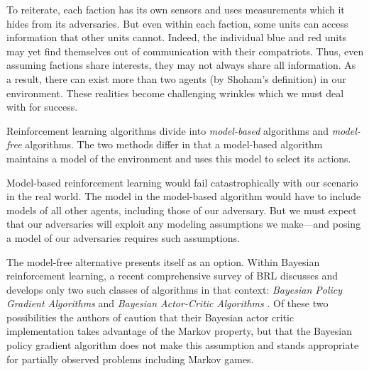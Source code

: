\documentclass{article}
\begin{document}
To reiterate, each faction has its own sensors and uses measurements
which it hides from its adversaries.  But even within each faction,
some units can access information that other units cannot.  Indeed,
the individual blue and red units may yet find themselves out of
communication with their compatriots.  Thus, even assuming factions
share interests, they may not always share all information.  As a
result, there can exist more than two agents (by Shoham's definition)
in our environment.  These realities become challenging wrinkles which
we must deal with for success.

Reinforcement learning algorithms divide into \emph{model-based}
algorithms and \emph{model-free} algorithms.  The two methods differ
in that a model-based algorithm maintains a model of the environment
and uses this model to select its actions.

Model-based reinforcement learning would fail catastrophically with
our scenario in the real world.  The model in the model-based
algorithm would have to include models of all other agents, including
those of our adversary.  But we must expect that our adversaries will
exploit any modeling assumptions we make---and posing a model of our
adversaries requires such assumptions.

The model-free alternative presents itself as an option.  Within
Bayesian reinforcement learning, a recent comprehensive survey of BRL
\cite{ghavamzadeh2016bayesian} discusses and develops only two such
classes of algorithms in that context: \emph{Bayesian Policy Gradient
  Algorithms} \cite{engel2007bayesian, ghavamzadeh2016abayesian} and
\emph{Bayesian Actor-Critic Algorithms} \cite{ghavamzadeh2007bayesian,
  ghavamzadeh2016abayesian}.  Of these two possibilities the authors
of \cite{ghavamzadeh2016bayesian} caution that their Bayesian actor
critic implementation takes advantage of the Markov property, but that
the Bayesian policy gradient algorithm does not make this assumption
and stands appropriate for partially observed problems including
Markov games.
\end{document}
